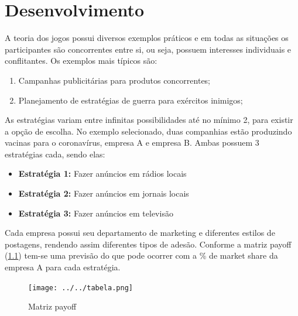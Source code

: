 \documentclass[
	12pt,				%
	openright,			%
	oneside,			%
	a4paper,			%
	english,			%
	french,				%
	spanish,			%
	brazil				%
	]{abntex2}
\begin{document}




\chapter{Desenvolvimento}

A teoria dos jogos possui diversos exemplos práticos e em todas as situações os participantes são concorrentes entre si, ou seja, possuem interesses individuais e conflitantes. Os exemplos mais típicos são:

\begin{enumerate}
\item Campanhas publicitárias para produtos concorrentes;
\item Planejamento de estratégias de guerra para exércitos inimigos;
\end{enumerate}

As estratégias variam entre infinitas possibilidades até no mínimo 2, para existir a opção de escolha. No exemplo selecionado, duas companhias estão produzindo vacinas para o coronavírus, empresa A e empresa B. Ambas possuem 3 estratégias cada, sendo elas: \cite{teoriadosjogos}

\begin{itemize}
\item \textbf{Estratégia 1:} Fazer anúncios em rádios locais
\item \textbf{Estratégia 2:} Fazer anúncios em jornais locais
\item \textbf{Estratégia 3:} Fazer anúncios em televisão
\end{itemize}

Cada empresa possui seu departamento de marketing e diferentes estilos de postagens, rendendo assim diferentes tipos de adesão. Conforme a matriz payoff (\ref{tab}) tem-se uma previsão do que pode ocorrer com a \% de market share da empresa A para cada estratégia.

\begin{figure}[H] \centering 
\caption{Matriz payoff}
\texttt{[image: ../../tabela.png]}
\label{tab}
\end{figure}
\end{document}
